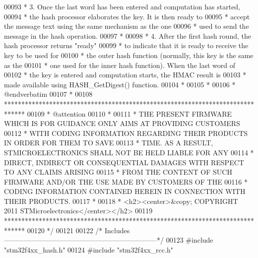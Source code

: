 \begin{DoxyCode}
00093 \textcolor{comment}{  *         3.  Once the last word has been entered and computation has started, }
00094 \textcolor{comment}{  *             the hash processor elaborates the key. It is then ready to }
00095 \textcolor{comment}{  *             accept the message text using the same mechanism as the one }
00096 \textcolor{comment}{  *             used to send the message in the hash operation.}
00097 \textcolor{comment}{  *       }
00098 \textcolor{comment}{  *         4.  After the first hash round, the hash processor returns "ready" }
00099 \textcolor{comment}{  *             to indicate that it is ready to receive the key to be used for }
00100 \textcolor{comment}{  *             the outer hash function (normally, this key is the same as the }
00101 \textcolor{comment}{  *             one used for the inner hash function). When the last word of }
00102 \textcolor{comment}{  *             the key is entered and computation starts, the HMAC result is }
00103 \textcolor{comment}{  *             made available using HASH\_GetDigest() function.}
00104 \textcolor{comment}{  *               }
00105 \textcolor{comment}{  *              }
00106 \textcolor{comment}{  *  @endverbatim}
00107 \textcolor{comment}{  *         }
00108 \textcolor{comment}{  ******************************************************************************}
00109 \textcolor{comment}{  * @attention}
00110 \textcolor{comment}{  *}
00111 \textcolor{comment}{  * THE PRESENT FIRMWARE WHICH IS FOR GUIDANCE ONLY AIMS AT PROVIDING CUSTOMERS}
00112 \textcolor{comment}{  * WITH CODING INFORMATION REGARDING THEIR PRODUCTS IN ORDER FOR THEM TO SAVE}
00113 \textcolor{comment}{  * TIME. AS A RESULT, STMICROELECTRONICS SHALL NOT BE HELD LIABLE FOR ANY}
00114 \textcolor{comment}{  * DIRECT, INDIRECT OR CONSEQUENTIAL DAMAGES WITH RESPECT TO ANY CLAIMS ARISING}
00115 \textcolor{comment}{  * FROM THE CONTENT OF SUCH FIRMWARE AND/OR THE USE MADE BY CUSTOMERS OF THE}
00116 \textcolor{comment}{  * CODING INFORMATION CONTAINED HEREIN IN CONNECTION WITH THEIR PRODUCTS.}
00117 \textcolor{comment}{  *}
00118 \textcolor{comment}{  * <h2><center>&copy; COPYRIGHT 2011 STMicroelectronics</center></h2>}
00119 \textcolor{comment}{  ******************************************************************************  }
00120 \textcolor{comment}{  */}
00121 
00122 \textcolor{comment}{/* Includes ------------------------------------------------------------------*/}
00123 \textcolor{preprocessor}{#}\textcolor{preprocessor}{include} "stm32f4xx_hash.h"
00124 \textcolor{preprocessor}{#}\textcolor{preprocessor}{include} "stm32f4xx_rcc.h"

\end{DoxyCode}
